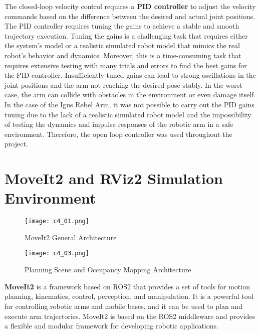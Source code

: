 The closed-loop velocity control requires a \textbf{PID controller} to adjust the velocity commands based on the
difference between the desired and actual joint positions. The PID controller requires tuning the gains to
achieve a stable and smooth trajectory execution. Tuning the gains is a challenging task that requires
either the system's model or a realistic simulated robot model that mimics the real robot's behavior and dynamics.
Moreover, this is a time-consuming task that requires extensive testing with many trials and errors to find the best gains 
for the PID controller. Insufficiently tuned gains can lead to strong oscillations in the joint positions and the arm
not reaching the desired pose stably. In the worst case, the arm can collide with obstacles in the environment
or even damage itself. In the case of the Igus Rebel Arm, it was not possible to carry out the PID gains tuning
due to the lack of a realistic simulated robot model and the impossibility of testing the dynamics and impulse responses
of the robotic arm in a safe environment. Therefore, the open loop controller was used throughout the project.

\section{MoveIt2 and RViz2 Simulation Environment}

\begin{figure}[t]
    \centering
    \texttt{[image: c4\_01.png]}
    \caption{MoveIt2 General Architecture}
    \label{fig:moveit2}
\end{figure}

\begin{figure}[t]
    \centering
    \texttt{[image: c4\_03.png]}
    \caption{Planning Scene and Occupancy Mapping Architecture}
    \label{fig:planninscence}
\end{figure}


\textbf{MoveIt2} is a framework based on ROS2 that provides a set of tools for motion planning, kinematics, control, 
perception, and manipulation. It is a powerful tool for controlling robotic arms and mobile bases, and it can be used to plan and
execute arm trajectories. MoveIt2 is based on the ROS2 middleware and provides a flexible and modular
framework for developing robotic applications.

